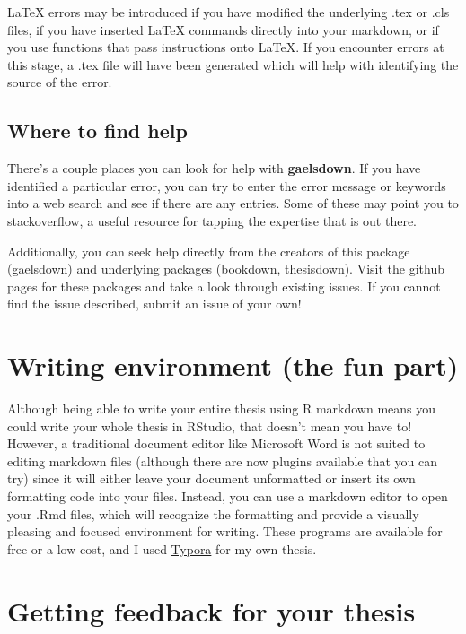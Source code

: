 \documentclass[12pt, oneside]{queensuthesis}
\numberwithin{equation}{chapter}       %
\begin{document}
LaTeX errors may be introduced if you have modified the underlying .tex or .cls files, if you have inserted LaTeX commands directly into your markdown, or if you use functions that pass instructions onto LaTeX. If you encounter errors at this stage, a .tex file will have been generated which will help with identifying the source of the error.

\hypertarget{where-to-find-help}{%
\subsection{Where to find help}\label{where-to-find-help}}

There's a couple places you can look for help with \textbf{gaelsdown}. If you have identified a particular error, you can try to enter the error message or keywords into a web search and see if there are any entries. Some of these may point you to stackoverflow, a useful resource for tapping the expertise that is out there.

Additionally, you can seek help directly from the creators of this package (gaelsdown) and underlying packages (bookdown, thesisdown). Visit the github pages for these packages and take a look through existing issues. If you cannot find the issue described, submit an issue of your own!

\hypertarget{writing-environment-the-fun-part}{%
\section{Writing environment (the fun part)}\label{writing-environment-the-fun-part}}

Although being able to write your entire thesis using R markdown means you could write your whole thesis in RStudio, that doesn't mean you have to! However, a traditional document editor like Microsoft Word is not suited to editing markdown files (although there are now plugins available that you can try) since it will either leave your document unformatted or insert its own formatting code into your files. Instead, you can use a markdown editor to open your .Rmd files, which will recognize the formatting and provide a visually pleasing and focused environment for writing. These programs are available for free or a low cost, and I used \href{http://typora.io}{Typora} for my own thesis.

\hypertarget{getting-feedback-for-your-thesis}{%
\section{Getting feedback for your thesis}\label{getting-feedback-for-your-thesis}}
\end{document}
